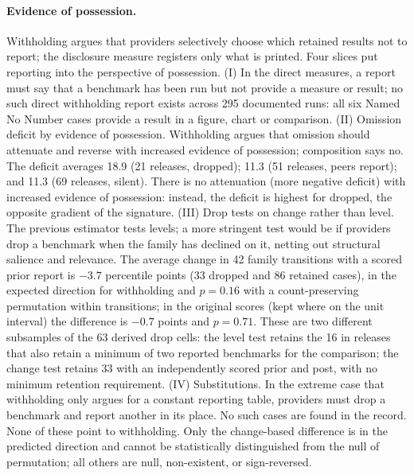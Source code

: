 \documentclass{article}
\begin{document}
\paragraph{Evidence of possession.}
Withholding argues that providers selectively choose which retained results not to report; the disclosure measure registers only what is printed. Four slices put reporting into the perspective of possession. (I) In the direct measures, a report must say that a benchmark has been run but not provide a measure or result; no such direct withholding report exists across 295 documented runs: all six Named No Number cases provide a result in a figure, chart or comparison. (II) Omission deficit by evidence of possession. Withholding argues that omission should attenuate and reverse with increased evidence of possession; composition says no. The deficit averages 18.9 (21 releases, dropped); 11.3 (51 releases, peers report); and 11.3 (69 releases, silent). There is no attenuation (more negative deficit) with increased evidence of possession: instead, the deficit is highest for dropped, the opposite gradient of the signature. (III) Drop tests on change rather than level. The previous estimator tests levels; a more stringent test would be if providers drop a benchmark when the family has declined on it, netting out structural salience and relevance. The average change in 42 family transitions with a scored prior report is $-3.7$ percentile points (33 dropped and 86 retained cases), in the expected direction for withholding and $p = 0.16$ with a count-preserving permutation within transitions; in the original scores (kept where on the unit interval) the difference is $-0.7$ points and $p = 0.71$. These are two different subsamples of the 63 derived drop cells: the level test retains the 16 in releases that also retain a minimum of two reported benchmarks for the comparison; the change test retains 33 with an independently scored prior and post, with no minimum retention requirement. (IV) Substitutions. In the extreme case that withholding only argues for a constant reporting table, providers must drop a benchmark and report another in its place. No such cases are found in the record. None of these point to withholding. Only the change-based difference is in the predicted direction and cannot be statistically distinguished from the null of permutation; all others are null, non-existent, or sign-reversed.
\end{document}

